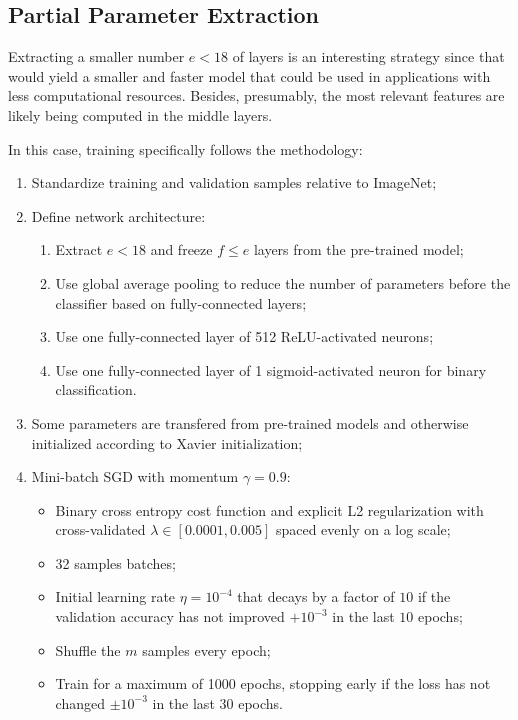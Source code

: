 \subsection{Partial Parameter Extraction}
\label{section:partial_parameter_extraction}

Extracting a smaller number $e < 18$ of layers is an interesting strategy since that would yield a smaller and faster model that could be used in applications with less computational resources. Besides, presumably, the most relevant features are likely being computed in the middle layers.

In this case, training specifically follows the methodology:

\begin{enumerate}
    \item Standardize training and validation samples relative to ImageNet;
    \item Define network architecture:
        \begin{enumerate}
            \item Extract $e < 18$ and freeze $f \leq e$ layers from the pre-trained model;
            \item Use global average pooling to reduce the number of parameters before the classifier based on fully-connected layers;
            \item Use one fully-connected layer of 512 ReLU-activated neurons;
            \item Use one fully-connected layer of 1 sigmoid-activated neuron for binary classification.
        \end{enumerate}
    \item Some parameters are transfered from pre-trained models and otherwise initialized according to Xavier initialization;
    \item Mini-batch \ac{SGD} with momentum $\gamma = 0.9$:
        \begin{itemize}
            \item Binary cross entropy cost function and explicit L2 regularization with cross-validated $\lambda \in [0.0001, 0.005]$ spaced evenly on a log scale;
            \item 32 samples batches;
            \item Initial learning rate $\eta = 10^{-4}$ that decays by a factor of $10$ if the validation accuracy has not improved $+10^{-3}$ in the last $10$ epochs;
            \item Shuffle the $m$ samples every epoch;
            \item Train for a maximum of 1000 epochs, stopping early if the loss has not changed $\pm 10^{-3}$ in the last $30$ epochs.
        \end{itemize}
\end{enumerate}

